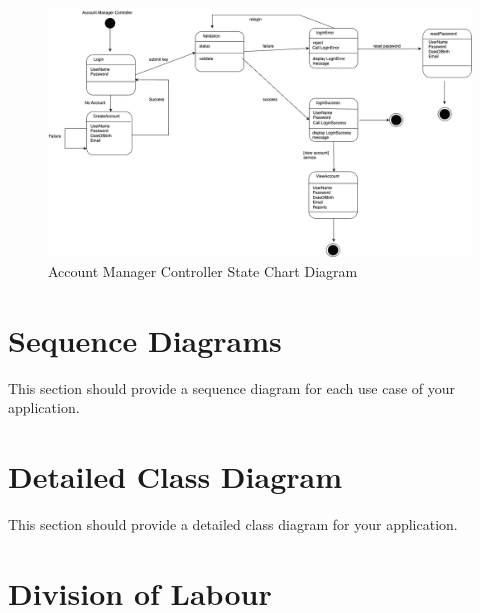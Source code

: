 \documentclass[]{article}
\numberwithin{figure}{section}
\begin{document}
\clearpage 
\begin{figure}[h]
    \centering
    \includegraphics[scale=0.4]{AccountManager.png}
    \caption{Account Manager Controller State Chart Diagram}
    \label{fig:account_manager_controller}
\end{figure}

\clearpage 


\section{Sequence Diagrams}
\label{sec:sequence_diagrams}
This section should provide a sequence diagram for each use case of your application.

\section{Detailed Class Diagram}
\label{sec:detailed_class_diagram}
This section should provide a detailed class diagram for your application.

\appendix
\section{Division of Labour}
\label{sec:division_of_labour}
\end{document}
